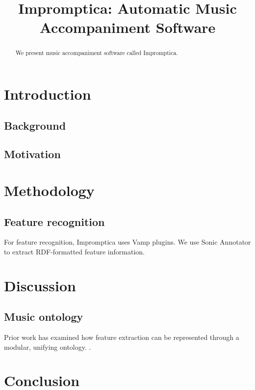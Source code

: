 \documentclass[11pt,conference,letterpaper]{IEEEtran}
\begin{document}
\title{Impromptica: Automatic Music Accompaniment Software}
\author{}

\maketitle

\begin{abstract}
We present music accompaniment software called Impromptica.
\end{abstract}

\section{Introduction}

\subsection{Background}

\subsection{Motivation}

\section{Methodology}

\subsection{Feature recognition}

For feature recognition, Impromptica uses Vamp plugins. We use Sonic Annotator to extract RDF-formatted feature information.

\section{Discussion}

\subsection{Music ontology}

Prior work has examined how feature extraction can be represented through a modular, unifying ontology. \cite{raimond2008web}.

\section{Conclusion}



\end{document}
